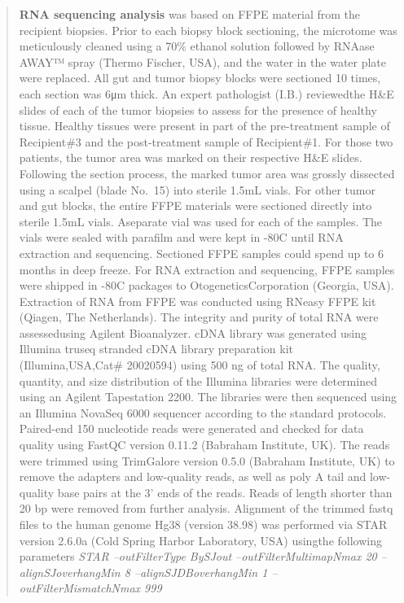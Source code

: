 \documentclass[
]{article}
\begin{document}
\begin{quote}
\textbf{RNA sequencing analysis} was based on FFPE material from the
recipient biopsies. Prior to each biopsy block sectioning, the microtome
was meticulously cleaned using a 70\% ethanol solution followed by
RNAase AWAY™ spray (Thermo Fischer, USA), and the water in the water
plate were replaced. All gut and tumor biopsy blocks were sectioned 10
times, each section was 6μm thick. An expert pathologist (I.B.)
reviewedthe H\&E slides of each of the tumor biopsies to assess for the
presence of healthy tissue. Healthy tissues were present in part of the
pre-treatment sample of Recipient\#3 and the post-treatment sample of
Recipient\#1. For those two patients, the tumor area was marked on their
respective H\&E slides. Following the section process, the marked tumor
area was grossly dissected using a scalpel (blade No.~15) into sterile
1.5mL vials. For other tumor and gut blocks, the entire FFPE materials
were sectioned directly into sterile 1.5mL vials. Aseparate vial was
used for each of the samples. The vials were sealed with parafilm and
were kept in -80C until RNA extraction and sequencing. Sectioned FFPE
samples could spend up to 6 months in deep freeze. For RNA extraction
and sequencing, FFPE samples were shipped in -80C packages to
OtogeneticsCorporation (Georgia, USA). Extraction of RNA from FFPE was
conducted using RNeasy FFPE kit (Qiagen, The Netherlands). The integrity
and purity of total RNA were assessedusing Agilent Bioanalyzer. cDNA
library was generated using Illumina truseq stranded cDNA library
preparation kit (Illumina,USA,Cat\# 20020594) using 500 ng of total RNA.
The quality, quantity, and size distribution of the Illumina libraries
were determined using an Agilent Tapestation 2200. The libraries were
then sequenced using an Illumina NovaSeq 6000 sequencer according to the
standard protocols. Paired-end 150 nucleotide reads were generated and
checked for data quality using FastQC version 0.11.2 (Babraham
Institute, UK). The reads were trimmed using TrimGalore version 0.5.0
(Babraham Institute, UK) to remove the adapters and low-quality reads,
as well as poly A tail and low-quality base pairs at the 3' ends of the
reads. Reads of length shorter than 20 bp were removed from further
analysis. Alignment of the trimmed fastq files to the human genome Hg38
(version 38.98) was performed via STAR version 2.6.0a (Cold Spring
Harbor Laboratory, USA) usingthe following parameters \emph{STAR
--outFilterType BySJout --outFilterMultimapNmax 20 --alignSJoverhangMin
8 --alignSJDBoverhangMin 1 -- outFilterMismatchNmax 999
}
\end{quote}
\end{document}
